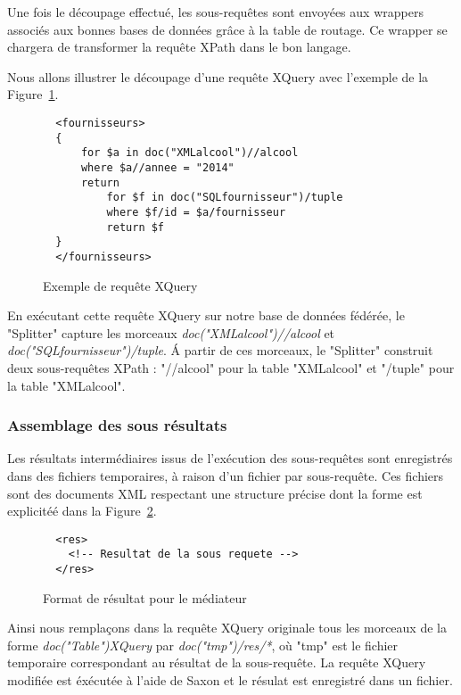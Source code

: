 \documentclass[a4paper,10pt]{article}
\newcommand{\fref}[1]{Figure~\ref{#1}}
\begin{document}
Une fois le découpage effectué, les sous-requêtes sont envoyées aux wrappers associés aux bonnes bases de données grâce à la table de routage.
Ce wrapper se chargera de transformer la requête XPath dans le bon langage.

Nous allons illustrer le découpage d'une requête XQuery avec l'exemple de la \fref{lst:exempleRequete}. 

\begin{figure}[ht!]
\begin{verbatim}
  <fournisseurs>
  {
      for $a in doc("XMLalcool")//alcool
      where $a//annee = "2014"
      return
          for $f in doc("SQLfournisseur")/tuple
          where $f/id = $a/fournisseur
          return $f	
  }
  </fournisseurs>
\end{verbatim}
\caption{Exemple de requête XQuery}
\label{lst:exempleRequete}
\end{figure}

En exécutant cette requête XQuery sur notre base de données fédérée, le "Splitter" capture les morceaux \emph{doc("XMLalcool")//alcool} et \emph{doc("SQLfournisseur")/tuple}.
\'A partir de ces morceaux, le "Splitter" construit deux sous-requêtes XPath : "//alcool" pour la table "XMLalcool" et "/tuple" pour la table "XMLalcool".





\subsubsection{Assemblage des sous résultats}

Les résultats intermédiaires issus de l'exécution des sous-requêtes sont enregistrés dans des fichiers temporaires, à raison d'un fichier par sous-requête.
Ces fichiers sont des documents XML respectant une structure précise dont la forme est explicitéé dans la \fref{lst:retourmediateur}.

\begin{figure}[ht!]
\begin{verbatim}
  <res>
	<!-- Resultat de la sous requete -->
  </res>
\end{verbatim}
\caption{Format de résultat pour le médiateur}
\label{lst:retourmediateur}
\end{figure}

Ainsi nous remplaçons dans la requête XQuery originale tous les morceaux de la forme \emph{doc("Table")XQuery} par \emph{doc("tmp")/res/*}, où "tmp" est le fichier temporaire correspondant au résultat de la sous-requête.
La requête XQuery modifiée est éxécutée à l'aide de Saxon et le résulat est enregistré dans un fichier.
\end{document}
